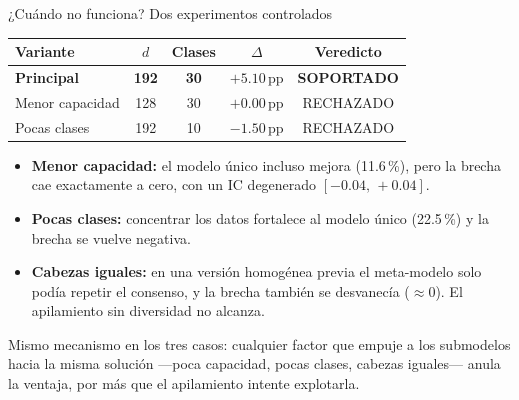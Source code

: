 \documentclass[aspectratio=169,10pt]{beamer}
\begin{document}
\begin{frame}{¿Cuándo no funciona? Dos experimentos controlados}
  \centering
  \small
  \begin{tabular}{lcccc}
    \toprule
    \textbf{Variante} & $d$ & Clases & $\Delta$ & \textbf{Veredicto} \\
    \midrule
    \textbf{Principal} & \textbf{192} & \textbf{30} & $\mathbf{+5.10}$\,pp
      & \textbf{SOPORTADO} \\
    Menor capacidad & 128 & 30 & $+0.00$\,pp & RECHAZADO \\
    Pocas clases    & 192 & 10 & $-1.50$\,pp & RECHAZADO \\
    \bottomrule
  \end{tabular}

  \vfill
  \raggedright
  {\small
  \begin{itemize}
    \item \textbf{Menor capacidad:} el modelo único incluso mejora
          (11.6\,\%), pero la brecha cae exactamente a cero, con un IC
          degenerado $[-0.04,\,+0.04]$.
    \item \textbf{Pocas clases:} concentrar los datos fortalece al modelo
          único (22.5\,\%) y la brecha se vuelve negativa.
    \item \textbf{Cabezas iguales:} en una versión homogénea previa el
          meta-modelo solo podía repetir el consenso, y la brecha también se
          desvanecía ($\approx 0$). El apilamiento sin diversidad no alcanza.
  \end{itemize}}

  \vfill
  \begin{block}{}
    Mismo mecanismo en los tres casos: cualquier factor que empuje a los
    submodelos \alert{hacia la misma solución} ---poca capacidad, pocas
    clases, cabezas iguales--- anula la ventaja, por más que el apilamiento
    intente explotarla.
  \end{block}
\end{frame}
\end{document}
